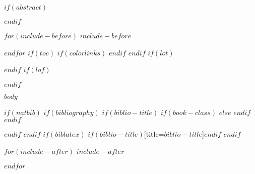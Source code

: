 \documentclass[12pt,letter,twoside]{article}
\begin{document}
\cleardoublepage

$if(abstract)$
\begin{abstract}
$abstract$
\end{abstract}
$endif$

$for(include-before)$
$include-before$

$endfor$
$if(toc)$
{
$if(colorlinks)$
\hypersetup{linkcolor=$if(toccolor)$$toccolor$$else$$endif$}
$endif$
\setcounter{tocdepth}{$toc-depth$}
\tableofcontents
}
$endif$
$if(lot)$
\listoftables
$endif$
$if(lof)$
\listoffigures
$endif$

\cleardoublepage
\mainmatter

$body$

$if(natbib)$
$if(bibliography)$
$if(biblio-title)$
$if(book-class)$
\renewcommand\bibname{$biblio-title$}
$else$
\renewcommand\refname{$biblio-title$}
$endif$
$endif$


$endif$
$endif$
$if(biblatex)$
\printbibliography$if(biblio-title)$[title=$biblio-title$]$endif$
$endif$

\clearpage
\backmatter

$for(include-after)$
$include-after$

$endfor$
\clearpage
\end{document}
